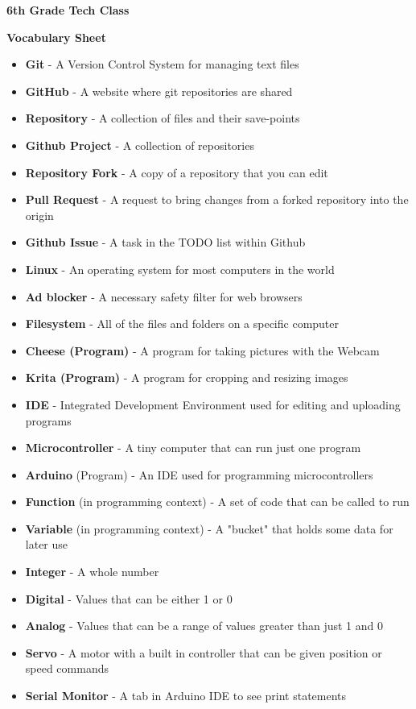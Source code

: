 \documentclass{article}
\begin{document}
	
{\huge \textbf{6th Grade Tech Class}}

\vspace{1cm}

{\huge \textbf{Vocabulary Sheet}}

\begin{itemize}
  \item \textbf{Git} - A Version Control System for managing text files
  \item \textbf{GitHub} - A website where git repositories are shared
  \item \textbf{Repository} - A collection of files and their save-points
  \item \textbf{Github Project} - A collection of repositories 
  \item \textbf{Repository Fork} - A copy of a repository that you can edit
  \item \textbf{Pull Request} - A request to bring changes from a forked repository into the origin
  \item \textbf{Github Issue} - A task in the TODO list within Github
  \item \textbf{Linux }- An operating system for most computers in the world
  \item \textbf{Ad blocker} - A necessary safety filter for web browsers
  \item \textbf{Filesystem }- All of the files and folders on a specific computer
  \item \textbf{Cheese (Program)} - A program for taking pictures with the Webcam
  \item \textbf{Krita (Program) }- A program for cropping and resizing images
  \item \textbf{IDE} - Integrated Development Environment used for editing and uploading programs
  \item \textbf{Microcontroller} - A tiny computer that can run just one program
  \item \textbf{Arduino} (Program) - An IDE used for programming microcontrollers
  \item \textbf{Function} (in programming context) - A set of code that can be called to run
  \item \textbf{Variable} (in programming context) - A "bucket" that holds some data for later use
  \item \textbf{Integer} - A whole number
  \item \textbf{Digital} - Values that can be either 1 or 0
  \item \textbf{Analog} - Values that can be a range of values greater than just 1 and 0
  \item \textbf{Servo} - A motor with a built in controller that can be given position or speed commands
  \item \textbf{Serial Monitor} - A tab in Arduino IDE to see print statements
  
\end{itemize}
\end{document}
